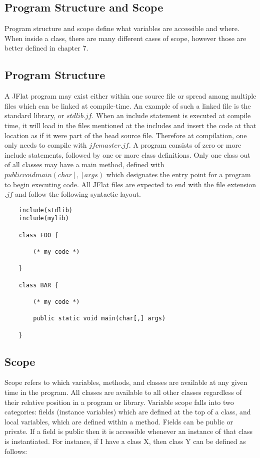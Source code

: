 \begin{homeworkProblem}
	\chapter{Program Structure and Scope}
	
	Program structure and scope define what variables are accessible and where. When inside a class, there are many different cases of scope, however those are better defined in chapter 7. 
	
	\section{Program Structure}
		
	A JFlat program may exist either within one source file or spread among multiple files which can be linked at compile-time. An example of such a linked file is the standard library, or $stdlib.jf$. When an include statement is executed at compile time, it will load in the files mentioned at the includes and insert the code at that location as if it were part of the head source file. Therefore at compilation, one only needs to compile with $jfc master.jf$. A program consists of zero or more include statements, followed by one or more class definitions. Only one class out of all classes may have a main method, defined with $public void main(char[,] args)$ which designates the entry point for a program to begin executing code. All JFlat files are expected to end with the file extension $.jf$ and follow the following syntactic layout. 
	
	\begin{verbatim}
	include(stdlib)
	include(mylib)
	
	class FOO {
	
		(* my code *)
	
	}
	
	class BAR {
	
		(* my code *)
		
		public static void main(char[,] args)
	
	}
	\end{verbatim}

	
	\section{Scope}
		
		
	Scope refers to which variables, methods, and classes are available at any given time in the program. All classes are available to all other classes regardless of their relative position in a program or library. Variable scope falls into two categories: fields (instance variables) which are defined at the top of a class, and local variables, which are defined within a method. Fields can be public or private. If a field is public then it is accessible whenever an instance of that class is instantiated. For instance, if I have a class X, then class Y can be defined as follows:
	

\end{homeworkProblem}
